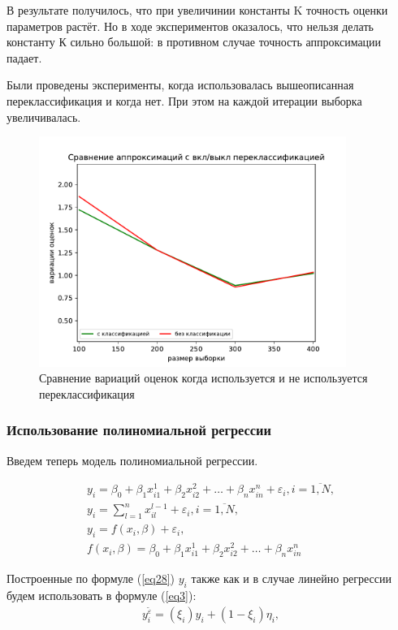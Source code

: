 В результате получилось, что при увеличинии константы K точность оценки параметров растёт. Но в ходе экспериментов оказалось, что нельзя делать константу К сильно большой: в противном случае точность аппроксимации падает.

Были проведены эксперименты, когда использовалась вышеописанная переклассификация и когда нет. При этом на каждой итерации выборка увеличивалась. 
\begin{figure}[h!]
    \centering
    \includegraphics[width=100mm]{../images/on_off_recl.pdf}
    \caption{Сравнение вариаций оценок когда используется и не используется переклассификация\label{overflow}}
    \label{pic2}
\end{figure}

\newpage

\subsubsection{Использование полиномиальной регрессии}
Введем теперь модель полиномиальной регрессии.

\begin{equation}
    \begin{array}{c}
        \label{eq28}y_i=\beta_0+\beta_1 x_{i1}^1+\beta_2 x_{i2}^2+\dots+\beta_n x_{in}^n+\varepsilon_i, i=\overline{1,N},\\
        y_i = \sum\limits_{l=1}^{n} x_{il}^{l-1} + \varepsilon_i, i=\overline{1,N},\\
        y_i= f(x_i,\beta)+\varepsilon_i,\\
        f(x_i,\beta)=\beta_0+\beta_1 x_{i1}^1+\beta_2 x_{i2}^2+\dots+\beta_n x_{in}^n
    \end{array}
\end{equation}

Построенные по формуле (\ref{eq28}) $y_i$ также как и в случае линейно регрессии будем использовать в формуле (\ref{eq3}):
\begin{eqnarray}
    y_i^{\widetilde{\varepsilon}}=(\xi_i)y_i+ (1-\xi_i)\eta_i,
\end{eqnarray}

